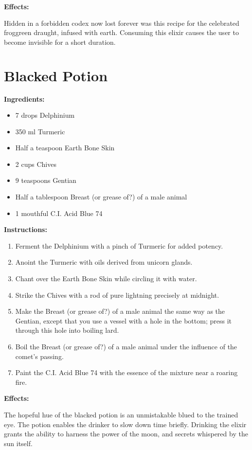 \documentclass{article}
\begin{document}
\textbf{Effects:}

Hidden in a forbidden codex now lost forever was this recipe for the celebrated froggreen draught, infused with earth. Consuming this elixir causes the user to become invisible for a short duration.

\newpage
\section*{Blacked Potion}

\textbf{Ingredients:}

\begin{itemize}
  \item 7 drops Delphinium
  \item 350 ml Turmeric
  \item Half a teaspoon Earth Bone Skin
  \item 2 cups Chives
  \item 9 teaspoons Gentian
  \item Half a tablespoon Breast (or grease of?) of a male animal
  \item 1 mouthful C.I. Acid Blue 74
\end{itemize}

\textbf{Instructions:}

\begin{enumerate}
  \item Ferment the Delphinium with a pinch of Turmeric for added potency.
  \item Anoint the Turmeric with oils derived from unicorn glands.
  \item Chant over the Earth Bone Skin while circling it with water.
  \item Strike the Chives with a rod of pure lightning precisely at midnight.
  \item Make the Breast (or grease of?) of a male animal the same way as the Gentian, except that you use a vessel with a hole in the bottom; press it through this hole into boiling lard.
  \item Boil the Breast (or grease of?) of a male animal under the influence of the comet’s passing.
  \item Paint the C.I. Acid Blue 74 with the essence of the mixture near a roaring fire.
\end{enumerate}

\textbf{Effects:}

The hopeful hue of the blacked potion is an unmistakable blued to the trained eye. The potion enables the drinker to slow down time briefly. Drinking the elixir grants the ability to harness the power of the moon, and secrets whispered by the sun itself.
\end{document}

